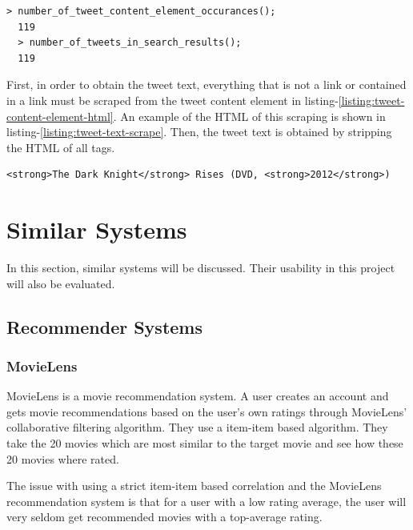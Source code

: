 \begin{lstlisting}[caption={Running functions in GCDT Javascript Console to show that the number of tweet content elements matches the number of tweets},label={listing:tweet-content-element-count-comparison},captionpos=b]
  > number_of_tweet_content_element_occurances();
  119
  > number_of_tweets_in_search_results();
  119
\end{lstlisting}

\noindent
First, in order to obtain the tweet text, everything that is not a link or contained in a link must be scraped from the tweet content element in listing-\ref{listing:tweet-content-element-html}. An example of the HTML of this scraping is shown in listing-\ref{listing:tweet-text-scrape}. Then, the tweet text is obtained by stripping the HTML of all tags.

\begin{lstlisting}[caption={The HTML of scraping everything from listing-\ref{listing:tweet-content-element-html} that is not a link},label={listing:tweet-text-scrape},captionpos=b]
  <strong>The Dark Knight</strong> Rises (DVD, <strong>2012</strong>)
\end{lstlisting}



\section{Similar Systems}
In this section, similar systems will be discussed. Their usability in this project will also be evaluated.


\subsection{Recommender Systems}
\subsubsection{MovieLens}\label{subsec:MovieLens}
MovieLens is a movie recommendation system. A user creates an account and gets movie recommendations based on the user's own ratings through MovieLens' collaborative filtering algorithm. They use a item-item based algorithm. They take the 20 movies which are most similar to the target movie and see how these 20 movies where rated.\cite{grouplens}

The issue with using a strict item-item based correlation and the MovieLens recommendation system is that for a user with a low rating average, the user will very seldom get recommended movies with a top-average rating.


